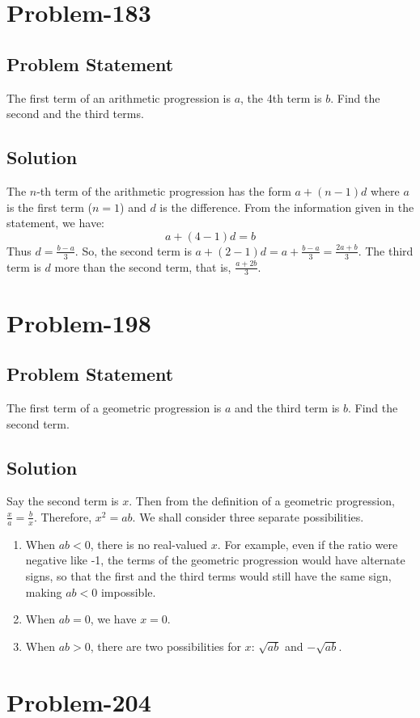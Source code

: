 \documentclass[12pt]{article}
\begin{document}
\section*{Problem-183}
\subsection*{Problem Statement}
The first term of an arithmetic progression is $a$, the 4th term is $b$. Find the second and the third terms.
\subsection*{Solution}
The $n$-th term of the arithmetic progression has the form $a+(n-1)d$ where $a$ is the first term ($n=1$) and $d$ is the difference. From the information given in the statement, we have:
\[
a + (4-1)d = b
\]
Thus $d = \frac{b-a}{3}$. So, the second term is $a+(2-1)d = a+\frac{b-a}{3} = \frac{2a+b}{3}$. The third term is $d$ more than the second term, that is, $\frac{a+2b}{3}$.

\section*{Problem-198}
\subsection*{Problem Statement}
The first term of a geometric progression is $a$ and the third term is $b$. Find the second term.
\subsection*{Solution}
Say the second term is $x$. Then from the definition of a geometric progression, $\frac{x}{a} = \frac{b}{x}$. Therefore, $x^2 = ab$. We shall consider three separate possibilities.
\begin{enumerate}
\item When $ab < 0$, there is no real-valued $x$. For example, even if the ratio were negative like -1, the terms of the geometric progression would have alternate signs, so that the first and the third terms would still have the same sign, making $ab < 0$ impossible.
\item When $ab = 0$, we have $x = 0$.
\item When $ab > 0$, there are two possibilities for $x$: $\sqrt{ab}$ and $-\sqrt{ab}$. 
\end{enumerate}

\section*{Problem-204}
\end{document}
